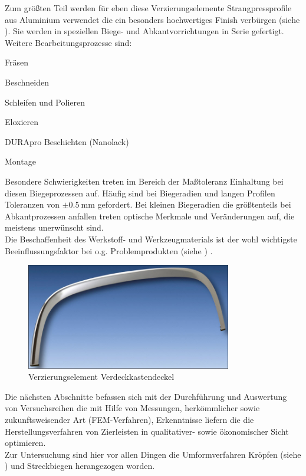 \documentclass[12pt,a4paper,parskip]{scrartcl}
\begin{document}
Zum größten Teil werden für eben diese Verzierungselemente
Strangpressprofile aus Aluminium verwendet die ein besonders hochwertiges Finish verbürgen (siehe ). Sie werden in speziellen Biege- und Abkantvorrichtungen in Serie gefertigt.
 Weitere Bearbeitungsprozesse sind: \begin{itemize*}
 \item Fräsen
 \item Beschneiden
 \item Schleifen und Polieren
 \item Eloxieren
 \item DURApro Beschichten (Nanolack)
 \item Montage
 \end{itemize*}
   Besondere Schwierigkeiten treten im Bereich der Maßtoleranz Einhaltung bei diesen Biegeprozessen auf. Häufig sind bei  Biegeradien und langen Profilen Toleranzen von $\pm \SI{0.5}{\milli\meter}$ gefordert. Bei kleinen Biegeradien die größtenteils bei Abkantprozessen anfallen treten optische Merkmale und Veränderungen auf, die meistens unerwünscht sind.\\
 Die Beschaffenheit des Werkstoff- und Werkzeugmaterials ist der wohl wichtigste Beeinflussungsfaktor bei o.g. Problemprodukten (siehe ) .
 \begin{figure}[hbtp]
 \centering
 \includegraphics[width=0.8\textwidth]{BauteilNeu}
 \caption{Verzierungselement Verdeckkastendeckel}
 \label{fig:Verdeckkastendeckel}
 \end{figure}

Die nächsten Abschnitte befassen sich mit der Durchführung und Auswertung von Versuchsreihen die mit Hilfe von Messungen, herkömmlicher sowie zukunftsweisender Art (FEM-Verfahren), Erkenntnisse liefern  die die Herstellungsverfahren von Zierleisten  in qualitativer- sowie ökonomischer Sicht  optimieren.\\
Zur Untersuchung   sind hier vor allen Dingen die Umformverfahren  Kröpfen (siehe )  und Streckbiegen herangezogen worden.
\end{document}

